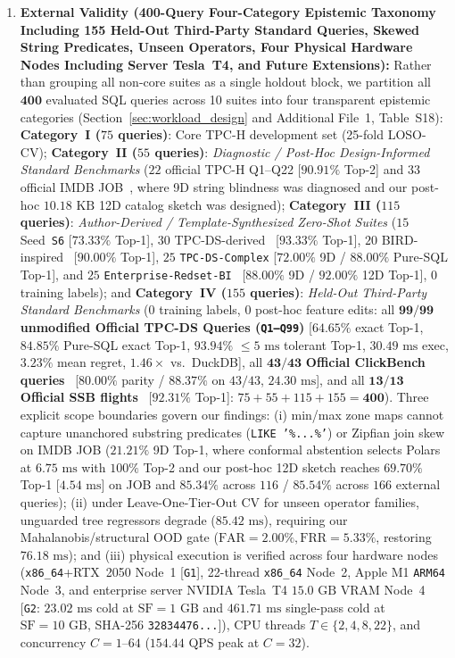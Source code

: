 \documentclass[10pt,a4paper]{article}
\begin{document}
\begin{enumerate}[leftmargin=1.5em,itemsep=0.8pt]
    \item \textbf{External Validity (400-Query Four-Category Epistemic Taxonomy Including 155 Held-Out Third-Party Standard Queries, Skewed String Predicates, Unseen Operators, Four Physical Hardware Nodes Including Server Tesla~T4, and Future Extensions):} Rather than grouping all non-core suites as a single holdout block, we partition all $\mathbf{400}$ evaluated SQL queries across 10 suites into four transparent epistemic categories (Section~\ref{sec:workload_design} and Additional File~1, Table~S18): \textbf{Category~I ($75$ queries)}: Core TPC-H development set (25-fold LOSO-CV); \textbf{Category~II ($55$ queries)}: \emph{Diagnostic / Post-Hoc Design-Informed Standard Benchmarks} ($22$ official TPC-H Q1--Q22 [$90.91\%$ Top-2] and $33$ official IMDB JOB~\cite{leis2015job}, where 9D string blindness was diagnosed and our post-hoc $10.18\text{ KB}$ 12D catalog sketch was designed); \textbf{Category~III ($115$ queries)}: \emph{Author-Derived / Template-Synthesized Zero-Shot Suites} ($15$ Seed~\texttt{S6} [$73.33\%$ Top-1], $30$ TPC-DS-derived~\cite{nambiar2006tpcds} [$93.33\%$ Top-1], $20$ BIRD-inspired~\cite{li2023bird} [$90.00\%$ Top-1], $25$ \texttt{TPC-DS-Complex} [$72.00\%$ 9D / $88.00\%$ Pure-SQL Top-1], and $25$ \texttt{Enterprise-Redset-BI}~\cite{vanrenen2024redset} [$88.00\%$ 9D / $92.00\%$ 12D Top-1], $0$ training labels); and \textbf{Category~IV ($155$ queries)}: \emph{Held-Out Third-Party Standard Benchmarks} ($0$ training labels, $0$ post-hoc feature edits: all $\mathbf{99/99}$ \textbf{unmodified Official TPC-DS Queries (\texttt{Q1--Q99})} [$64.65\%$ exact Top-1, $84.85\%$ Pure-SQL exact Top-1, $93.94\%$ $\le 5\text{ ms}$ tolerant Top-1, $30.49\text{ ms}$ exec, $3.23\%$ mean regret, $1.46\times$ vs.\ DuckDB], all $\mathbf{43/43}$ \textbf{Official ClickBench queries}~\cite{clickbench2022} [$80.00\%$ parity / $88.37\%$ on $43/43$, $24.30\text{ ms}$], and all $\mathbf{13/13}$ \textbf{Official SSB flights}~\cite{oneil2009ssb} [$92.31\%$ Top-1]: $75 + 55 + 115 + 155 = \mathbf{400}$). Three explicit scope boundaries govern our findings: (i) min/max zone maps cannot capture unanchored substring predicates (\texttt{LIKE '\%...\%'}) or Zipfian join skew on IMDB JOB ($21.21\%$ 9D Top-1, where conformal abstention selects Polars at $6.75\text{ ms}$ with $100\%$ Top-2 and our post-hoc 12D sketch reaches $69.70\%$ Top-1 [$4.54\text{ ms}$] on JOB and $85.34\%$ across $116$ / $85.54\%$ across $166$ external queries); (ii) under Leave-One-Tier-Out CV for unseen operator families, unguarded tree regressors degrade ($85.42\text{ ms}$), requiring our Mahalanobis/structural OOD gate ($\text{FAR}=2.00\%, \text{FRR}=5.33\%$, restoring $76.18\text{ ms}$); and (iii) physical execution is verified across four hardware nodes (\texttt{x86\_64}+RTX~2050 Node~1 [\texttt{G1}], 22-thread \texttt{x86\_64} Node~2, Apple M1 \texttt{ARM64} Node~3, and enterprise server NVIDIA Tesla~T4 $15.0\text{ GB}$ VRAM Node~4 [\texttt{G2}: $23.02\text{ ms}$ cold at $\text{SF}=1\text{ GB}$ and $461.71\text{ ms}$ single-pass cold at $\text{SF}=10\text{ GB}$, SHA-256 \texttt{32834476...}]), CPU threads $T \in \{2, 4, 8, 22\}$, and concurrency $C=1\text{--}64$ ($154.44\text{ QPS}$ peak at $C=32$). 
\end{enumerate}
\end{document}
